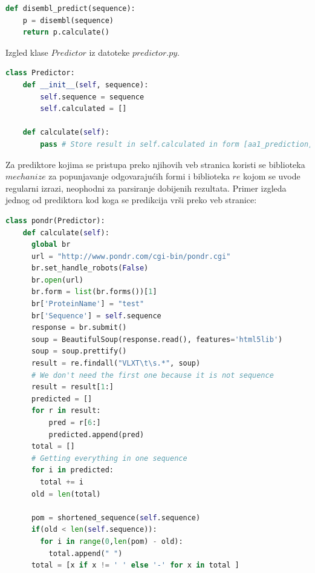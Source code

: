 \begin{enumerate}
\begin{lstlisting}[language=Python]
def disembl_predict(sequence):
    p = disembl(sequence)
    return p.calculate() 
\end{lstlisting}
Izgled klase $Predictor$ iz datoteke $predictor.py$.
\begin{lstlisting}[language=Python]
class Predictor:
    def __init__(self, sequence):
        self.sequence = sequence
        self.calculated = []

    def calculate(self):
        pass # Store result in self.calculated in form [aa1_prediction, aa2_prediction, aa3_prediction, ...]
\end{lstlisting}
Za prediktore kojima se pristupa preko njihovih veb stranica koristi se biblioteka $mechanize$ za popunjavanje odgovarajućih formi i biblioteka $re$ kojom se uvode regularni izrazi, neophodni za parsiranje dobijenih rezultata. Primer izgleda jednog od prediktora kod koga se predikcija vrši preko veb stranice:
\begin{lstlisting}[language=Python]
class pondr(Predictor):
    def calculate(self):
      global br
      url = "http://www.pondr.com/cgi-bin/pondr.cgi" 
      br.set_handle_robots(False)
      br.open(url)
      br.form = list(br.forms())[1] 
      br['ProteinName'] = "test"
      br['Sequence'] = self.sequence 
      response = br.submit()
      soup = BeautifulSoup(response.read(), features='html5lib')
      soup = soup.prettify()
      result = re.findall("VLXT\t\s.*", soup)
      # We don't need the first one because it is not sequence
      result = result[1:]
      predicted = []
      for r in result:
          pred = r[6:]
          predicted.append(pred)
      total = []
      # Getting everything in one sequence 
      for i in predicted:
        total += i
      old = len(total)
      
      pom = shortened_sequence(self.sequence)
      if(old < len(self.sequence)):
        for i in range(0,len(pom) - old):
          total.append(" ")
      total = [x if x != ' ' else '-' for x in total ]
      

\end{lstlisting}
\end{enumerate}
